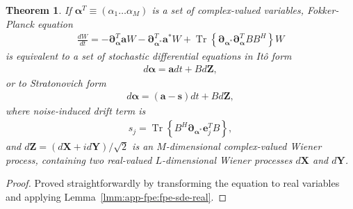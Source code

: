 \documentclass[12pt,aip,jmp,amssymb,amsmath]{revtex4-1}
\newtheorem{theorem}{Theorem}
\begin{document}
\begin{theorem}
\label{thm:app-fpe:fpe-sde-complex}
    If $\boldsymbol{\alpha}^T \equiv (\alpha_1 \ldots \alpha_M)$ is a set of complex-valued variables,
    Fokker-Planck equation
    \begin{equation*}\begin{split}
        \frac{dW}{dt}
        = -\boldsymbol{\partial}_{\boldsymbol{\alpha}}^T \boldsymbol{a} W - \boldsymbol{\partial}_{\boldsymbol{\alpha}^*}^T \boldsymbol{a}^* W
        + \operatorname{Tr} \left\{ \boldsymbol{\partial}_{\boldsymbol{\alpha}^*} \boldsymbol{\partial}_{\boldsymbol{\alpha}}^T B B^H \right\} W
    \end{split}\end{equation*}
    is equivalent to a set of stochastic differential equations in It\^{o} form
    \begin{equation*}\begin{split}
        d\boldsymbol{\alpha} = \boldsymbol{a} dt + B d\boldsymbol{Z},
    \end{split}\end{equation*}
    or to Stratonovich form
    \begin{equation*}\begin{split}
        d\boldsymbol{\alpha} = (\boldsymbol{a} - \boldsymbol{s}) dt + B d\boldsymbol{Z},
    \end{split}\end{equation*}
    where noise-induced drift term is
    \begin{equation*}\begin{split}
        s_j = \operatorname{Tr} \left\{ B^H \boldsymbol{\partial}_{\boldsymbol{\alpha}^*} \boldsymbol{e}_j^T B \right\},
    \end{split}\end{equation*}
    and $d\boldsymbol{Z} = (d\boldsymbol{X} + id\boldsymbol{Y}) / \sqrt{2}$ is an $M$-dimensional complex-valued Wiener process,
    containing two real-valued $L$-dimensional Wiener processes $d\boldsymbol{X}$ and $d\boldsymbol{Y}$.
\end{theorem}
\begin{proof}
Proved straightforwardly by transforming the equation to real variables and applying Lemma~\ref{lmm:app-fpe:fpe-sde-real}.
\end{proof}
\end{document}
